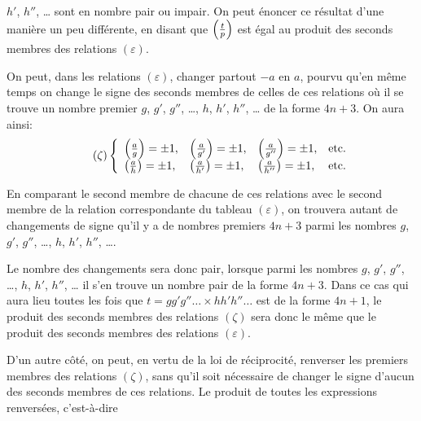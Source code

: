 \par\noindent
$h'$, $h''$, \ldots{} sont en nombre pair ou impair. On peut énoncer ce résultat d'une manière un
peu différente, en disant que $\left(\frac{t}{p}\right)$ est égal au produit des seconds membres des relations
$(\varepsilon)$.
\par\indent
On peut, dans les relations $(\varepsilon)$, changer partout $-a$ en $a$, pourvu qu'en même temps
on change le signe des seconds membres de celles de ces relations où il se trouve un nombre
premier $g$, $g'$, $g''$, \ldots{}, $h$, $h'$, $h''$, \ldots{} de la forme $4n+3$. On aura ainsi:
\begin{equation*}\tag{$\zeta$}
\left\{
\begin{array}{llll}
\left(\frac{a}{g}\right)=\pm1,& \left(\frac{a}{g'}\right)=\pm1,& \left(\frac{a}{g''}\right)=\pm1,& \text{etc.}\\[0.3em]
\left(\frac{a}{h}\right)=\pm1,& \left(\frac{a}{h'}\right)=\pm1,& \left(\frac{a}{h''}\right)=\pm1,& \text{etc.}
\end{array}
\right.
\end{equation*}
\par\indent
En comparant le second membre de chacune de ces relations avec le second membre de la relation
correspondante du tableau $(\varepsilon)$, on trouvera autant de changements de signe qu'il y a de
nombres premiers $4n+3$ parmi les nombres $g$, $g'$, $g''$, \ldots{}, $h$, $h'$, $h''$, \ldots{}.
\par\indent
Le nombre des changements sera donc pair, lorsque parmi les nombres $g$, $g'$, $g''$, \ldots{},
$h$, $h'$, $h''$, \ldots{} il s'en trouve un nombre pair de la forme $4n+3$. Dans ce cas qui aura
lieu toutes les fois que $t=gg'g''\ldots{}\times hh'h''\ldots$ est de la forme $4n+1$, le produit
des seconds membres des relations $(\zeta)$ sera donc le même que le produit des seconds membres
des relations $(\varepsilon)$.
\par\indent
D'un autre côté, on peut, en vertu de la loi de réciprocité, renverser les premiers membres des
relations $(\zeta)$, sans qu'il soit nécessaire de changer le signe d'aucun des seconds membres de
ces relations. Le produit de toutes les expressions renversées, c'est-à-dire
